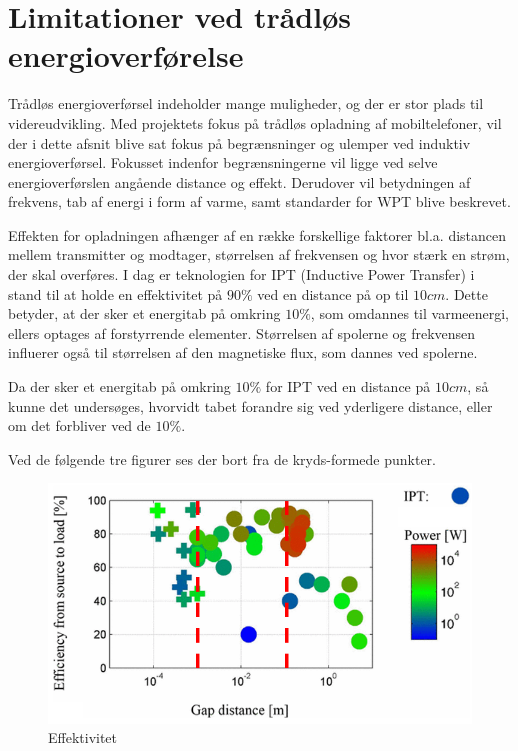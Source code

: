 \section{Limitationer ved trådløs energioverførelse }
Trådløs energioverførsel indeholder mange muligheder, og der er stor plads til videreudvikling. Med projektets fokus på trådløs opladning af mobiltelefoner, vil der i dette afsnit blive sat fokus på begrænsninger og ulemper ved induktiv energioverførsel. Fokusset indenfor begrænsningerne vil ligge ved selve energioverførslen angående distance og effekt. Derudover vil betydningen af frekvens, tab af energi i form af varme, samt standarder for WPT blive beskrevet.

Effekten for opladningen afhænger af en række forskellige faktorer bl.a. distancen mellem transmitter og modtager, størrelsen af frekvensen og hvor stærk en strøm, der skal overføres. I dag er teknologien for IPT (Inductive Power Transfer) i stand til at holde en effektivitet på $90\%$ ved en distance på op til $10cm$. Dette betyder, at der sker et energitab på omkring $10\%$, som omdannes til varmeenergi, ellers optages af forstyrrende elementer. Størrelsen af spolerne og frekvensen influerer også til størrelsen af den magnetiske flux, som dannes ved spolerne.

Da der sker et energitab på omkring $10\%$ for IPT ved en distance på $10cm$, så kunne det undersøges, hvorvidt tabet forandre sig ved yderligere distance, eller om det forbliver ved de $10\%$.

Ved de følgende tre figurer ses der bort fra de kryds-formede punkter.

\begin{figure}[H]
\centering
\includegraphics[scale=0.5]{Vildledning/Schematics/Effektivitet_vs_gap.png}
\caption{Effektivitet \cite{limit}}
\label{effektivitet}
\end{figure}

